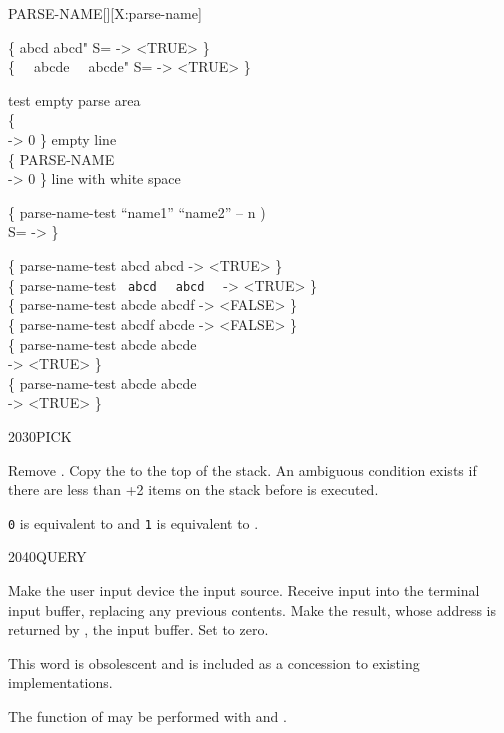 \begin{worddef}{}{PARSE-NAME}[][X:parse-name]
\begin{defer}
	\testing
		\{  abcd  abcd" S= -> <TRUE> \} \\
		\{  \verb*"  "abcde\verb*"  "  abcde" S= -> <TRUE> \}

		 test empty parse area \\
		\{  \\
		\tab {} -> 0 \}  empty line \\
		\{ PARSE-NAME \verb*"  " \\
		\tab {} -> 0 \}  line with white space

		\{ \word{:} parse-name-test  ``name1'' ``name2'' -- n ) \\
		\tab {}  S= \word{;} -> \}

		\{ parse-name-test abcd abcd -> <TRUE> \} \\
		\{ parse-name-test \verb*" abcd" \verb*"  abcd  " -> <TRUE> \} \\
		\{ parse-name-test abcde abcdf -> <FALSE> \} \\
		\{ parse-name-test abcdf abcde -> <FALSE> \} \\
		\{ parse-name-test abcde abcde \\
		\tab -> <TRUE> \} \\
		\{ parse-name-test abcde abcde\verb*"  " \\
		\tab -> <TRUE> \}
	\end{defer}
\end{worddef}


\begin{worddef}{2030}{PICK}
\item {}

	Remove . Copy the  to the top of the stack.
	An ambiguous condition exists if there are less than +2
	items on the stack before  is executed.

	\begin{defer}
	\rationale %
		\texttt{0}  is equivalent to  and
		\texttt{1}  is equivalent to .
	\end{defer}
\end{worddef}


\begin{worddef}{2040}{QUERY}
\item \stack{}{}

	Make the user input device the input source. Receive input into
	the terminal input buffer, replacing any previous contents. Make
	the result, whose address is returned by , the input
	buffer. Set  to zero.

\note
	This word is obsolescent and is included as a concession to
	existing implementations.

	\begin{defer}
	\rationale %
		The function of  may be performed with \word{ACCEPT}
		and \word{EVALUATE}.
	\end{defer}
\end{worddef}


